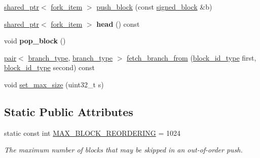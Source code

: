 \begin{DoxyCompactItemize}
\item 
\mbox{\hyperlink{classfc_1_1shared__ptr}{shared\+\_\+ptr}}$<$ \mbox{\hyperlink{structaacio_1_1chain_1_1fork__item}{fork\+\_\+item}} $>$ \mbox{\hyperlink{classaacio_1_1chain_1_1fork__database_ae9ce87aac5b9f14e08fccff4e6e98fdb}{push\+\_\+block}} (const \mbox{\hyperlink{structaacio_1_1chain_1_1signed__block}{signed\+\_\+block}} \&b)
\item 
\mbox{\label{classaacio_1_1chain_1_1fork__database_a62fd37b2b67afad20e7cfb335a6b512e}} 
\mbox{\hyperlink{classfc_1_1shared__ptr}{shared\+\_\+ptr}}$<$ \mbox{\hyperlink{structaacio_1_1chain_1_1fork__item}{fork\+\_\+item}} $>$ {\bfseries head} () const
\item 
\mbox{\label{classaacio_1_1chain_1_1fork__database_aa6bdd84233afbf7ad60b66372e8d9ef5}} 
void {\bfseries pop\+\_\+block} ()
\item 
\mbox{\hyperlink{structpair}{pair}}$<$ \mbox{\hyperlink{classstd_1_1vector}{branch\+\_\+type}}, \mbox{\hyperlink{classstd_1_1vector}{branch\+\_\+type}} $>$ \mbox{\hyperlink{classaacio_1_1chain_1_1fork__database_a309c5e2cb8d499551cc71356dfab46cc}{fetch\+\_\+branch\+\_\+from}} (\mbox{\hyperlink{classfc_1_1sha256}{block\+\_\+id\+\_\+type}} first, \mbox{\hyperlink{classfc_1_1sha256}{block\+\_\+id\+\_\+type}} second) const
\item 
void \mbox{\hyperlink{classaacio_1_1chain_1_1fork__database_af7877508fbed8bde99d84a582993494c}{set\+\_\+max\+\_\+size}} (uint32\+\_\+t s)
\end{DoxyCompactItemize}
\subsection*{Static Public Attributes}
\begin{DoxyCompactItemize}
\item 
\mbox{\label{classaacio_1_1chain_1_1fork__database_aaacb7f8c80b1870832150462ce1cc448}} 
static const int \mbox{\hyperlink{classaacio_1_1chain_1_1fork__database_aaacb7f8c80b1870832150462ce1cc448}{M\+A\+X\+\_\+\+B\+L\+O\+C\+K\+\_\+\+R\+E\+O\+R\+D\+E\+R\+I\+NG}} = 1024
\begin{DoxyCompactList}\small\item\em The maximum number of blocks that may be skipped in an out-\/of-\/order push. \end{DoxyCompactList}\end{DoxyCompactItemize}


